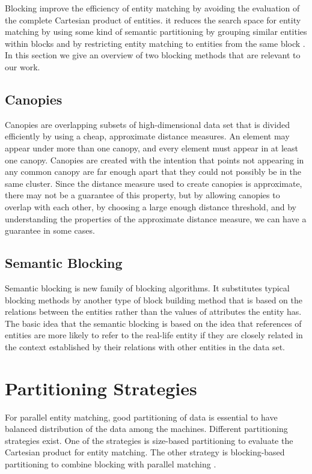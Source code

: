 Blocking improve the efficiency of entity matching by avoiding the evaluation of the complete Cartesian product of entities. it reduces the search space for entity matching by using some kind of semantic partitioning by grouping similar entities within blocks and by restricting entity matching to entities from the same block \cite{KKH*10}. In this section we give an overview of two blocking methods that are relevant to our work.


\subsection{Canopies}
Canopies\cite{MNUn00} are overlapping subsets of high-dimensional data set that is divided efficiently by using a cheap, approximate distance measures. An element may appear under more than one canopy, and every element must appear in at least one canopy. Canopies are created with the intention that points not appearing in any common canopy are far enough apart that they could not possibly be in the same cluster. Since the distance measure used to create canopies is approximate, there may not be a guarantee of this property, but by allowing canopies to overlap with each other, by choosing a large enough distance threshold, and by understanding the properties of the approximate distance measure, we can have a guarantee in some cases.

\subsection{Semantic Blocking}
Semantic blocking is new family of blocking algorithms\cite{NMM*07}. It substitutes typical blocking methods by another type of block building method that is based on the relations between the entities rather than the values of attributes the entity has. The basic idea that the semantic blocking is based on the idea that references of entities are more likely to refer to the real-life entity if they are closely related in the context established by their relations with other entities in the data set.

\section{Partitioning Strategies}
For parallel entity matching, good partitioning of data is essential to have balanced distribution of the data among the machines. Different partitioning strategies exist. One of the strategies is size-based partitioning to evaluate the Cartesian product for entity matching. The other strategy is blocking-based partitioning to combine blocking with parallel matching \cite{KKH*10}. 

